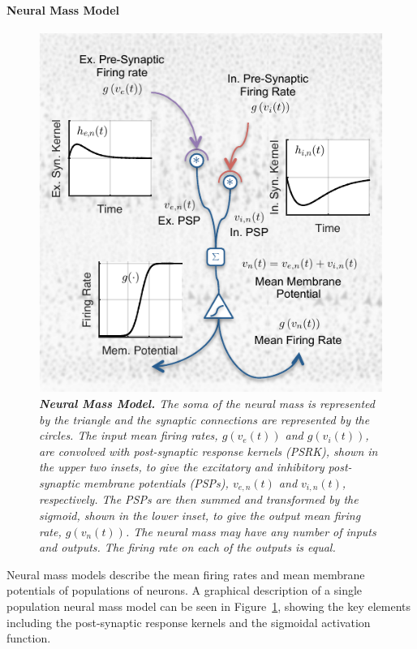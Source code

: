 \documentclass{article}
\begin{document}
\paragraph{Neural Mass Model}
\begin{figure}[ht]
  \begin{center}
    \includegraphics{./figures/pdf/SingleMass2.pdf}
  \end{center}
  \caption{\emph{\textbf{Neural Mass Model.} The soma of the neural mass is represented by the triangle and the synaptic connections are represented by the circles. The input mean firing rates, $g(v_{e}(t))$ and $g(v_{i}(t))$, are convolved with post-synaptic response kernels (PSRK), shown in the upper two insets, to give the excitatory and inhibitory post-synaptic membrane potentials (PSPs), $v_{e,n}(t)$ and $v_{i,n}(t)$, respectively. The PSPs are then summed and transformed by the sigmoid, shown in the lower inset, to give the output mean firing rate, $g(v_n(t))$. The neural mass may have any number of inputs and outputs. The firing rate on each of the outputs is equal.}}
  \label{fig:SingleNeuralMass}
\end{figure}
Neural mass models describe the mean firing rates and mean membrane potentials of populations of neurons. A graphical description of a single population neural mass model can be seen in Figure~\ref{fig:SingleNeuralMass}, showing the key elements including the post-synaptic response kernels and the sigmoidal activation function. 
\end{document}
